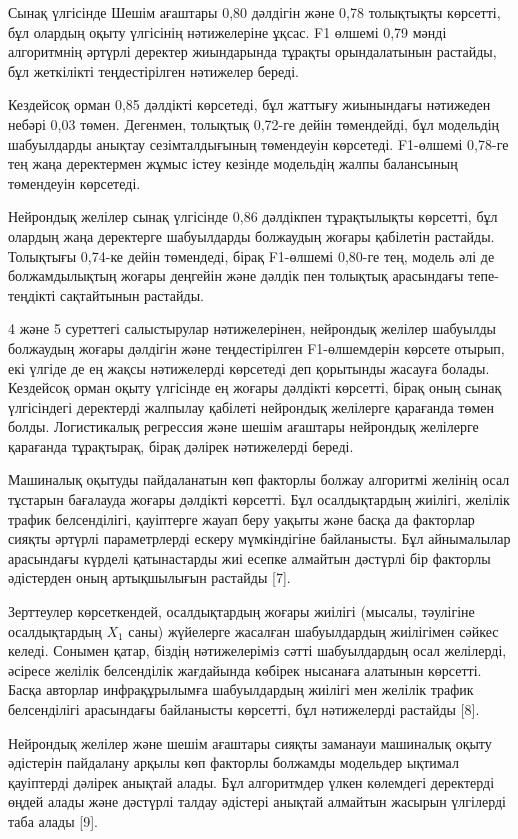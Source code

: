 Сынақ үлгісінде Шешім ағаштары 0,80 дәлдігін және 0,78 толықтықты
көрсетті, бұл олардың оқыту үлгісінің нәтижелеріне ұқсас. F1 өлшемі 0,79
мәнді алгоритмнің әртүрлі деректер жиындарында тұрақты орындалатынын
растайды, бұл жеткілікті теңдестірілген нәтижелер береді.

Кездейсоқ орман 0,85 дәлдікті көрсетеді, бұл жаттығу жиынындағы
нәтижеден небәрі 0,03 төмен. Дегенмен, толықтық 0,72-ге дейін
төмендейді, бұл модельдің шабуылдарды анықтау сезімталдығының төмендеуін
көрсетеді. F1-өлшемі 0,78-ге тең жаңа деректермен жұмыс істеу кезінде
модельдің жалпы балансының төмендеуін көрсетеді.

Нейрондық желілер сынақ үлгісінде 0,86 дәлдікпен тұрақтылықты көрсетті,
бұл олардың жаңа деректерге шабуылдарды болжаудың жоғары қабілетін
растайды. Толықтығы 0,74-ке дейін төмендеді, бірақ F1-өлшемі 0,80-ге
тең, модель әлі де болжамдылықтың жоғары деңгейін және дәлдік пен
толықтық арасындағы тепе-теңдікті сақтайтынын растайды.

4 және 5 суреттегі салыстырулар нәтижелерінен, нейрондық желілер
шабуылды болжаудың жоғары дәлдігін және теңдестірілген F1-өлшемдерін
көрсете отырып, екі үлгіде де ең жақсы нәтижелерді көрсетеді деп
қорытынды жасауға болады. Кездейсоқ орман оқыту үлгісінде ең жоғары
дәлдікті көрсетті, бірақ оның сынақ үлгісіндегі деректерді жалпылау
қабілеті нейрондық желілерге қарағанда төмен болды. Логистикалық
регрессия және шешім ағаштары нейрондық желілерге қарағанда тұрақтырақ,
бірақ дәлірек нәтижелерді береді.

Машиналық оқытуды пайдаланатын көп факторлы болжау алгоритмі желінің
осал тұстарын бағалауда жоғары дәлдікті көрсетті. Бұл осалдықтардың
жиілігі, желілік трафик белсенділігі, қауіптерге жауап беру уақыты және
басқа да факторлар сияқты әртүрлі параметрлерді ескеру мүмкіндігіне
байланысты. Бұл айнымалылар арасындағы күрделі қатынастарды жиі есепке
алмайтын дәстүрлі бір факторлы әдістерден оның артықшылығын растайды
{[}7{]}.

Зерттеулер көрсеткендей, осалдықтардың жоғары жиілігі (мысалы, тәулігіне
осалдықтардың \(X_{1}\) саны) жүйелерге жасалған шабуылдардың жиілігімен
сәйкес келеді. Сонымен қатар, біздің нәтижелеріміз сәтті шабуылдардың
осал желілерді, әсіресе желілік белсенділік жағдайында көбірек нысанаға
алатынын көрсетті. Басқа авторлар инфрақұрылымға шабуылдардың жиілігі
мен желілік трафик белсенділігі арасындағы байланысты көрсетті, бұл
нәтижелерді растайды {[}8{]}.

Нейрондық желілер және шешім ағаштары сияқты заманауи машиналық оқыту
әдістерін пайдалану арқылы көп факторлы болжамды модельдер ықтимал
қауіптерді дәлірек анықтай алады. Бұл алгоритмдер үлкен көлемдегі
деректерді өңдей алады және дәстүрлі талдау әдістері анықтай алмайтын
жасырын үлгілерді таба алады {[}9{]}.


